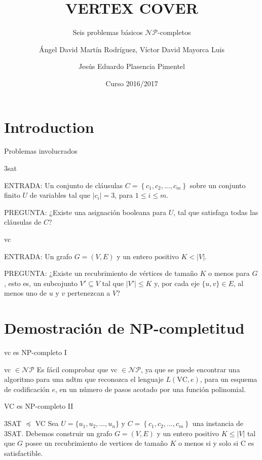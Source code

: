 \documentclass[10pt, mathserif, profesionalfont]{beamer}
\title{VERTEX COVER}
\subtitle{Seis problemas básicos $\mathcal{NP}$-completos}
\author{Ángel David Martín Rodríguez, Víctor David Mayorca Luis \and Jesús Eduardo Plasencia Pimentel}
\institute[ULL]{Universidad de La Laguna} %
\date{Curso 2016/2017}
\begin{document}
\begin{frame}
  \titlepage
\end{frame}



\section{Introduction}


\begin{frame}{Problemas involucrados}

\begin{block}{\gls{3sat}}
{\small
\noindent ENTRADA: Un conjunto de cláusulas $C=\left \{c_1, c_2, \dots, c_m \right \}$ sobre un conjunto finito $U$ de variables tal que $|c_i|=3$, para $1\le i \le m$.

\noindent PREGUNTA: ¿Existe una asignación booleana para $U$, tal que satisfaga todas las cláusulas de $C$? 
}
\end{block}

\begin{block}{\gls{vc}}
{\small 
\noindent ENTRADA: Un grafo $G = (V,E)$ y un entero positivo $K < |V|$.

\noindent PREGUNTA: ¿Existe un recubrimiento de vértices de tamaño $K$ o menos para $G$, esto es, un subcojunto $V' \subseteq V$ tal que $|V'|\le K$ y, por cada eje $\{u,v\} \in E$, al menos uno de $u$ y $v$ pertenezcan a $V$?
}
\end{block}

\end{frame}

\section{Demostración de NP-completitud}

\begin{frame}{\gls{vc} es NP-completo I}
    
\begin{block}{\gls{vc} $\in \mathcal{NP}$}    
Es fácil comprobar que \gls{vc}	$\in \mathcal{NP}$, ya que se puede encontrar una algoritmo para una \gls{ndtm} que reconozca el lenguaje $L(\mbox{VC},e)$, para un esquema de codificación $e$, en un número de pasos acotado por una función polinomial.

\end{block}

\end{frame}

\begin{frame}{VC es NP-completo II}
    
\begin{block}{3SAT $\preceq$ VC}
Sea $U=\{u_1,u_2,\ldots,u_n\}$ y $C=\left \{c_1, c_2, \dots, c_m \right \}$ una instancia de 3SAT. Debemos construir un grafo $G=(V,E)$ y un entero positivo $K \le |V|$ tal que $G$ posee un recubrimiento de vertices de tamaño $K$ o menos si y solo si C es satisfactible.
\end{block}

\end{frame}
\end{document}
